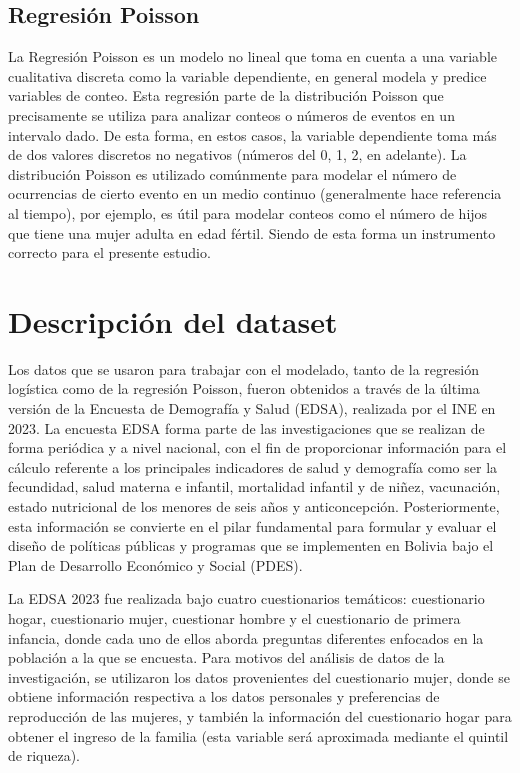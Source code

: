 \documentclass[Royal,times,sageh]{sagej}
\begin{document}
\subsection{Regresión Poisson}\label{regresiuxf3n-poisson}

La Regresión Poisson es un modelo no lineal que toma en cuenta a una
variable cualitativa discreta como la variable dependiente, en general
modela y predice variables de conteo. Esta regresión parte de la
distribución Poisson que precisamente se utiliza para analizar conteos o
números de eventos en un intervalo dado. De esta forma, en estos casos,
la variable dependiente toma más de dos valores discretos no negativos
(números del 0, 1, 2, en adelante). La distribución Poisson es utilizado
comúnmente para modelar el número de ocurrencias de cierto evento en un
medio continuo (generalmente hace referencia al tiempo), por ejemplo, es
útil para modelar conteos como el número de hijos que tiene una mujer
adulta en edad fértil. Siendo de esta forma un instrumento correcto para
el presente estudio.

\section{Descripción del dataset}\label{descripciuxf3n-del-dataset}

Los datos que se usaron para trabajar con el modelado, tanto de la
regresión logística como de la regresión Poisson, fueron obtenidos a
través de la última versión de la Encuesta de Demografía y Salud (EDSA),
realizada por el INE en 2023. La encuesta EDSA forma parte de las
investigaciones que se realizan de forma periódica y a nivel nacional,
con el fin de proporcionar información para el cálculo referente a los
principales indicadores de salud y demografía como ser la fecundidad,
salud materna e infantil, mortalidad infantil y de niñez, vacunación,
estado nutricional de los menores de seis años y anticoncepción.
Posteriormente, esta información se convierte en el pilar fundamental
para formular y evaluar el diseño de políticas públicas y programas que
se implementen en Bolivia bajo el Plan de Desarrollo Económico y Social
(PDES).

La EDSA 2023 fue realizada bajo cuatro cuestionarios temáticos:
cuestionario hogar, cuestionario mujer, cuestionar hombre y el
cuestionario de primera infancia, donde cada uno de ellos aborda
preguntas diferentes enfocados en la población a la que se encuesta.
Para motivos del análisis de datos de la investigación, se utilizaron
los datos provenientes del cuestionario mujer, donde se obtiene
información respectiva a los datos personales y preferencias de
reproducción de las mujeres, y también la información del cuestionario
hogar para obtener el ingreso de la familia (esta variable será
aproximada mediante el quintil de riqueza).
\end{document}

